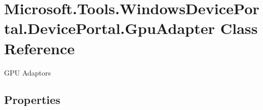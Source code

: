 \hypertarget{class_microsoft_1_1_tools_1_1_windows_device_portal_1_1_device_portal_1_1_gpu_adapter}{}\section{Microsoft.\+Tools.\+Windows\+Device\+Portal.\+Device\+Portal.\+Gpu\+Adapter Class Reference}
\label{class_microsoft_1_1_tools_1_1_windows_device_portal_1_1_device_portal_1_1_gpu_adapter}


G\+PU Adaptors  


\subsection*{Properties}
